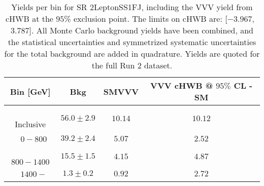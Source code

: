 \begin{table}[!htbp]
    \small
    \center
    \begin{tabular}{c||c|c|c}
    Bin [GeV] & Bkg & SMVVV & \pbox{20cm}{VVV \\ cHWB @ $95\%$ CL - SM \\ }\\
    \hline
    \pbox{20cm}{ ~ \\Inclusive\\ } & $56.0 \pm 2.9$ & $10.14$ & $10.12$\\
    \hline
    \pbox{20cm}{ ~ \\$0-800$\\ } & $39.2 \pm 2.4$ & $5.07$ & $2.52$\\
    \hline
    \pbox{20cm}{ ~ \\$800-1400$\\ } & $15.5 \pm 1.5$ & $4.15$ & $4.87$\\
    \hline
    \pbox{20cm}{ ~ \\$1400-$\\ } & $1.3 \pm 0.2$ & $0.92$ & $2.72$\\
\end{tabular}
    \caption{Yields per bin for SR 2LeptonSS1FJ, including the VVV yield from cHWB at the $95$\% exclusion point. The limits on cHWB are: [$-3.967$,~$3.787$]. All Monte Carlo background yields have been combined, and the statistical uncertainties and symmetrized systematic uncertainties for the total background are added in quadrature. Yields are quoted for the full Run 2 dataset.}
    \label{tab:2LeptonSS1FJ$binssignal}
\end{table}
